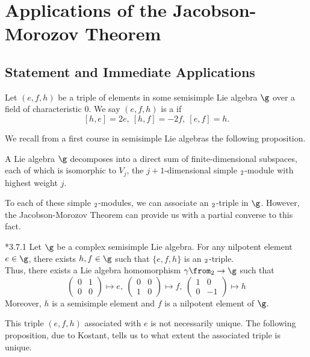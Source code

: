 \documentclass[springer-theory-notes.tex]{subfiles}
\begin{document}
\section{Applications of the Jacobson-Morozov Theorem}
\subsection{Statement and Immediate Applications}
\begin{defn}
  Let \((e,f,h)\) be a triple of elements in some semisimple Lie
  algebra \(\g\) over a field of characteristic \(0\). We say
  \((e,f,h)\) is a  if \[
    [h,e] =  2e, \ [h,f] = -2f, \ [e,f] = h.
  \]
\end{defn}
We recall from a first course in semisimple Lie algebras the following
proposition. 
\begin{prop}
  A Lie algebra \(\g\) decomposes into a direct sum of
  finite-dimensional subspaces, each of which is isomorphic to
  \(V_j\), the \(j+1\)-dimensional simple \(\sl_2\)-module with
  highest weight \(j\). 
\end{prop}
To each of these simple \(\sl_2\)-modules, we can associate an
\(\sl_2\)-triple in \(\g\). However, the Jacobson-Morozov Theorem can
provide us with a partial converse to this fact.
\begin{thm}
  \cite{cg}*{3.7.1} Let \(\g\) be a complex semisimple Lie
  algebra. For any nilpotent 
  element \(e \in \g\), there 
  exists \(h,f \in \g\) such that \(\{e,f,h\}\) is an
  \(\sl_2\)-triple. \\

  Thus, there exists a Lie algebra homomorphism \(\gamma \from \sl_2
  \to \g\) such that \[
    \left(
      \begin{array}{cc}
        0&1\\
        0&0
      \end{array}
\right) \mapsto e, \ \left(
  \begin{array}{cc}
    0&0\\
    1&0
  \end{array}
\right) \mapsto f, \ \left(
  \begin{array}{cc}
    1&0\\
    0&-1
  \end{array}
\right) \mapsto h
\]
  Moreover, \(h\) is a semisimple element and \(f\) is a nilpotent
  element of \(\g\).
\end{thm}
\begin{rmk}
  This triple \((e,f,h)\) associated with \(e\) is not necessarily
  unique. The following proposition, due to Kostant, tells us to what
  extent the associated triple is unique.
\end{rmk}
\end{document}
